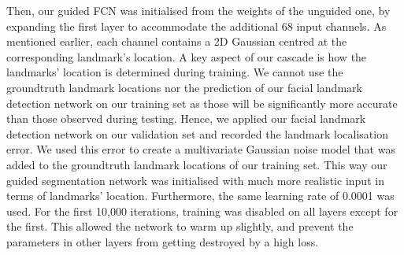 Then, our guided FCN was initialised from the weights of the unguided
one, by expanding the first layer to accommodate the additional 68
input channels. As mentioned earlier, each channel contains a 2D
Gaussian centred at the corresponding landmark's location.  A key
aspect of our cascade is how the landmarks' location is determined
during training. We cannot use the groundtruth landmark locations nor
the prediction of our facial landmark detection network on our
training set as those will be significantly more accurate than those
observed during testing. Hence, we applied our facial landmark
detection network on our validation set and recorded the landmark
localisation error. We used this error to create a multivariate
Gaussian noise model that was added to the groundtruth landmark
locations of our training set. This way our guided segmentation
network was initialised with much more realistic input in terms of
landmarks' location. Furthermore, the same learning rate of 0.0001 was
used. For the first 10,000 iterations, training was disabled on all
layers except for the first. This allowed the network to warm up
slightly, and prevent the parameters in other layers from getting
destroyed by a high loss.

